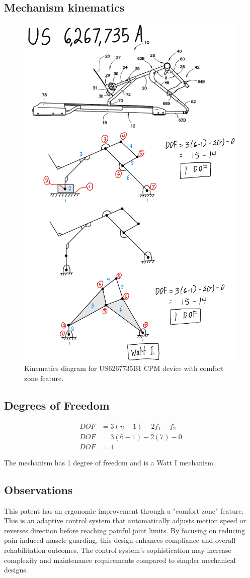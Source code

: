 \documentclass[11pt]{article}
\begin{document}
\subsection{Mechanism kinematics}
\begin{figure}[H]
  \centering
  \includegraphics[width=0.54\linewidth]{../Kinematic Mechanism Images/6267735.png}
  \caption{Kinematics diagram for US6267735B1 CPM device with comfort zone feature.}
  \label{fig:US6267735B1_kinematics}
\end{figure}

\subsection{Degrees of Freedom}
\[
\begin{aligned}
DOF &= 3(n-1) - 2f_1 - f_2 \\
DOF &= 3(6-1) - 2(7) - 0 \\
DOF &= 1
\end{aligned}
\]

The mechanism has 1 degree of freedom and is a Watt I mechanism.

\subsection{Observations}
This patent has an ergonomic improvement through a "comfort zone" feature. This is an adaptive control system that automatically adjusts motion speed or reverses direction before reaching painful joint limits. By focusing on reducing pain induced muscle guarding, this design enhances compliance and overall rehabilitation outcomes. The control system's sophistication may increase complexity and maintenance requirements compared to simpler mechanical designs.
\end{document}
